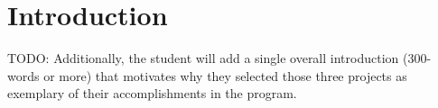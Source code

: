 \section{Introduction}

TODO: Additionally, the student will add a single overall introduction (300-words or more) that motivates
why they selected those three projects as exemplary of their accomplishments in the program.